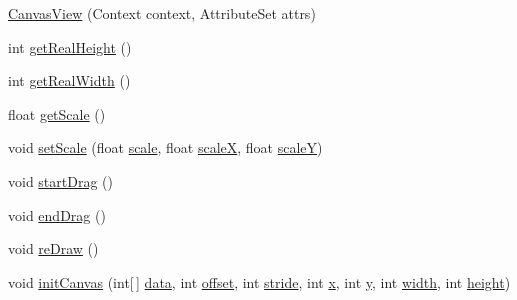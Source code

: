 \begin{DoxyCompactItemize}
\item 
\hyperlink{classes_1_1ucm_1_1tfg_1_1controlremotolinux_1_1client_1_1view_1_1CanvasView_abf61c876dc168cc0dd7127b6d2ee599e}{Canvas\-View} (Context context, Attribute\-Set attrs)
\item 
int \hyperlink{classes_1_1ucm_1_1tfg_1_1controlremotolinux_1_1client_1_1view_1_1CanvasView_a6103cf34fe6db477cdce9a1800e6a89d}{get\-Real\-Height} ()
\item 
int \hyperlink{classes_1_1ucm_1_1tfg_1_1controlremotolinux_1_1client_1_1view_1_1CanvasView_a624a938ee92ee1646292fd887cd11cef}{get\-Real\-Width} ()
\item 
float \hyperlink{classes_1_1ucm_1_1tfg_1_1controlremotolinux_1_1client_1_1view_1_1CanvasView_aa2a61addf1b96ae17b2d56d69e1e6216}{get\-Scale} ()
\item 
void \hyperlink{classes_1_1ucm_1_1tfg_1_1controlremotolinux_1_1client_1_1view_1_1CanvasView_a0c67965110402610909c29526aa27dbe}{set\-Scale} (float \hyperlink{classes_1_1ucm_1_1tfg_1_1controlremotolinux_1_1client_1_1view_1_1CanvasView_a067c5b12dd207283d5b21a2f6a473f4b}{scale}, float \hyperlink{classes_1_1ucm_1_1tfg_1_1controlremotolinux_1_1client_1_1view_1_1CanvasView_a1beab521f46e4d437aebcfd5ea6a463a}{scale\-X}, float \hyperlink{classes_1_1ucm_1_1tfg_1_1controlremotolinux_1_1client_1_1view_1_1CanvasView_a159269358421696f1d29dc1c46c05ad9}{scale\-Y})
\item 
void \hyperlink{classes_1_1ucm_1_1tfg_1_1controlremotolinux_1_1client_1_1view_1_1CanvasView_aceb8c5400ed1623ef664cfffff52f0e7}{start\-Drag} ()
\item 
void \hyperlink{classes_1_1ucm_1_1tfg_1_1controlremotolinux_1_1client_1_1view_1_1CanvasView_a11046fc9fc6769116e5f6f5ebd509b91}{end\-Drag} ()
\item 
void \hyperlink{classes_1_1ucm_1_1tfg_1_1controlremotolinux_1_1client_1_1view_1_1CanvasView_a57ea01dac003903b77a1da1b5cf3a8ba}{re\-Draw} ()
\item 
void \hyperlink{classes_1_1ucm_1_1tfg_1_1controlremotolinux_1_1client_1_1view_1_1CanvasView_a429357bb9cd1bbc27a63c34f28511d9f}{init\-Canvas} (int\mbox{[}$\,$\mbox{]} \hyperlink{classes_1_1ucm_1_1tfg_1_1controlremotolinux_1_1client_1_1view_1_1CanvasView_a379683c9544af8c623b8f49cf3062b88}{data}, int \hyperlink{classes_1_1ucm_1_1tfg_1_1controlremotolinux_1_1client_1_1view_1_1CanvasView_aaad40278d6a02c9ef89b426c0af45dc3}{offset}, int \hyperlink{classes_1_1ucm_1_1tfg_1_1controlremotolinux_1_1client_1_1view_1_1CanvasView_a63fe13f7edde39580f52dc14375feb08}{stride}, int \hyperlink{classes_1_1ucm_1_1tfg_1_1controlremotolinux_1_1client_1_1view_1_1CanvasView_af005a9add4d1ef816049f202ee288195}{x}, int \hyperlink{classes_1_1ucm_1_1tfg_1_1controlremotolinux_1_1client_1_1view_1_1CanvasView_ace7698a28d38fb30045ffd5548036cee}{y}, int \hyperlink{classes_1_1ucm_1_1tfg_1_1controlremotolinux_1_1client_1_1view_1_1CanvasView_a8a78b8d52c5a8dee1efc232c3b785f7e}{width}, int \hyperlink{classes_1_1ucm_1_1tfg_1_1controlremotolinux_1_1client_1_1view_1_1CanvasView_a68e85caf0a76be8f32eb052facfd309f}{height})
\end{DoxyCompactItemize}
